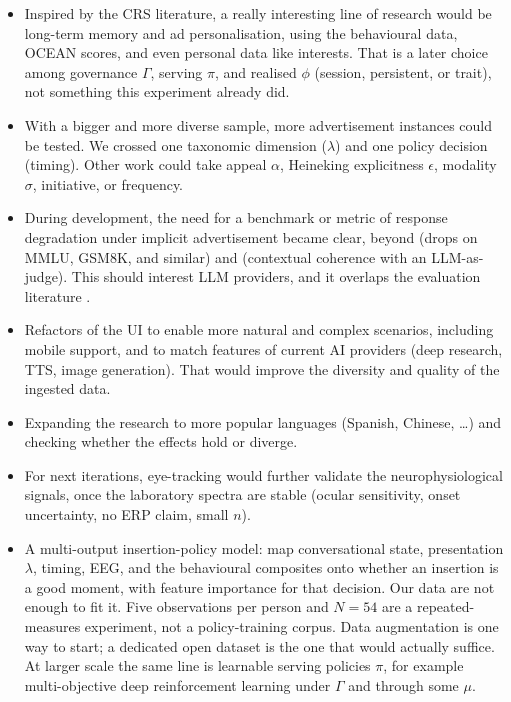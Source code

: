 \documentclass[english]{article}
\begin{document}
\begin{itemize}
    \item Inspired by the CRS literature, a really interesting line of research would be long-term memory and ad personalisation, using the behavioural data, OCEAN scores, and even personal data like interests. That is a later choice among governance \(\Gamma\), serving \(\pi\), and realised \(\phi\) (session, persistent, or trait), not something this experiment already did.
    \item With a bigger and more diverse sample, more advertisement instances could be tested. We crossed one taxonomic dimension (\(\lambda\)) and one policy decision (timing). Other work could take appeal \(\alpha\), Heineking explicitness \(\epsilon\), modality \(\sigma\), initiative, or frequency.
    \item During development, the need for a benchmark or metric of response degradation under implicit advertisement became clear, beyond \cite{tang2025adstalkbackimplications} (drops on MMLU, GSM8K, and similar) and \cite{xu2026ad} (contextual coherence with an LLM-as-judge). This should interest LLM providers, and it overlaps the evaluation literature \cite{es2025ragasautomatedevaluationretrieval}.
    \item Refactors of the UI to enable more natural and complex scenarios, including mobile support, and to match features of current AI providers (deep research, TTS, image generation). That would improve the diversity and quality of the ingested data.
    \item Expanding the research to more popular languages (Spanish, Chinese, \ldots) and checking whether the effects hold or diverge.
    \item For next iterations, eye-tracking would further validate the neurophysiological signals, once the laboratory spectra are stable (ocular sensitivity, onset uncertainty, no ERP claim, small \(n\)).
    \item A multi-output insertion-policy model: map conversational state, presentation \(\lambda\), timing, EEG, and the behavioural composites onto whether an insertion is a good moment, with feature importance for that decision. Our data are not enough to fit it. Five observations per person and \(N=54\) are a repeated-measures experiment, not a policy-training corpus. Data augmentation is one way to start; a dedicated open dataset is the one that would actually suffice. At larger scale the same line is learnable serving policies \(\pi\), for example multi-objective deep reinforcement learning under \(\Gamma\) and through some \(\mu\).
\end{itemize}
\end{document}
